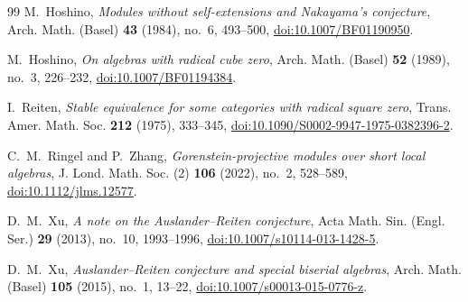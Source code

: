 \documentclass[a4paper,reqno]{amsart}
\numberwithin{equation}{section}
\begin{document}
\begin{thebibliography}{99}
 M.~Hoshino,
\emph{Modules without self-extensions and Nakayama's conjecture},
Arch. Math. (Basel) \textbf{43} (1984), no.~6, 493--500,
\href{https://doi.org/10.1007/BF01190950}{doi:10.1007/BF01190950}.

 M.~Hoshino,
\emph{On algebras with radical cube zero},
Arch. Math. (Basel) \textbf{52} (1989), no.~3, 226--232,
\href{https://doi.org/10.1007/BF01194384}{doi:10.1007/BF01194384}.

 I.~Reiten,
\emph{Stable equivalence for some categories with radical square zero},
Trans. Amer. Math. Soc. \textbf{212} (1975), 333--345,
\href{https://doi.org/10.1090/S0002-9947-1975-0382396-2}
{doi:10.1090/S0002-9947-1975-0382396-2}.

 C.~M.~Ringel and P.~Zhang,
\emph{Gorenstein-projective modules over short local algebras},
J. Lond. Math. Soc. (2) \textbf{106} (2022), no.~2, 528--589,
\href{https://doi.org/10.1112/jlms.12577}{doi:10.1112/jlms.12577}.

 D.~M.~Xu,
\emph{A note on the Auslander--Reiten conjecture},
Acta Math. Sin. (Engl. Ser.) \textbf{29} (2013), no.~10, 1993--1996,
\href{https://doi.org/10.1007/s10114-013-1428-5}
{doi:10.1007/s10114-013-1428-5}.

 D.~M.~Xu,
\emph{Auslander--Reiten conjecture and special biserial algebras},
Arch. Math. (Basel) \textbf{105} (2015), no.~1, 13--22,
\href{https://doi.org/10.1007/s00013-015-0776-z}
{doi:10.1007/s00013-015-0776-z}.

\end{thebibliography}
\end{document}
